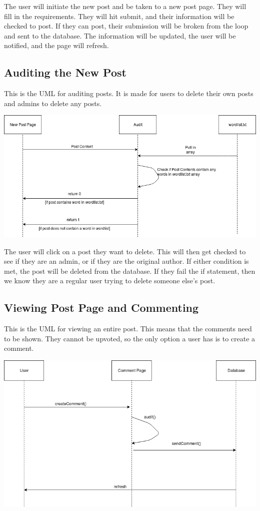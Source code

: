 \documentclass[12pt]{article}
\begin{document}
The user will initiate the new post and be taken to a new post page. They will fill in the requirements. They will hit submit, and their information will be checked to post. If they can post, their submission will be broken from the loop and sent to the database. The information will be updated, the user will be notified, and the page will refresh.
\subsection{Auditing the New Post}
This is the UML for auditing posts. It is made for users to delete their own posts and admins to delete any posts.

\includegraphics[scale=0.50]{img/uml/audit}

The user will click on a post they want to delete. This will then get checked to see if they are an admin, or if they are the original author. If either condition is met, the post will be deleted from the database. If they fail the if statement, then we know they are a regular user trying to delete someone else’s post.
\subsection{Viewing Post Page and Commenting}
This is the UML for viewing an entire post. This means that the comments need to be shown. They cannot be upvoted, so the only option a user has is to create a comment.

\includegraphics[scale=0.50]{img/uml/createComment}
\end{document}
